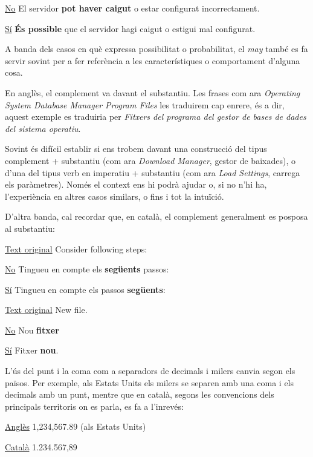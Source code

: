 \documentclass[9pt]{cheatsheet}
\begin{document}
\begin{multicols*}{3}
\underline {No} El servidor \textbf{pot haver caigut} o estar configurat incorrectament.

\underline {Sí} \textbf{És possible} que el servidor hagi caigut o estigui mal configurat.

A banda dels casos en què expressa possibilitat o probabilitat, el \emph{may} també es fa servir sovint per a fer referència a les característiques o comportament d’alguna cosa.


En anglès, el complement va davant el substantiu. Les frases com ara \emph{Operating System Database Manager Program Files} les traduirem cap enrere, és a dir, aquest exemple es traduiria per \emph{Fitxers del programa del gestor de bases de dades del sistema operatiu}.

Sovint és difícil establir si ens trobem davant una construcció del tipus complement + substantiu (com ara \emph{Download Manager}, gestor de baixades), o d’una del tipus verb en imperatiu + substantiu (com ara \emph{Load Settings}, carrega els paràmetres). Només el context ens hi podrà ajudar o, si no n’hi ha, l’experiència en altres casos similars, o fins i tot la intuïció.

D’altra banda, cal recordar que, en català, el complement generalment es posposa al substantiu:

\underline {Text original} Consider following steps:

\underline {No} Tingueu en compte els \textbf{següents} passos:

\underline {Sí} Tingueu en compte els passos \textbf{següents}:


\underline {Text original} New file.

\underline {No} Nou \textbf{fitxer}

\underline {Sí} Fitxer \textbf{nou}.




L’ús del punt i la coma com a separadors de decimals i milers canvia segon els països. Per exemple, als Estats Units els milers se separen amb una coma i els decimals amb un punt, mentre que en català, segons les convencions dels principals territoris on es parla, es fa a l’inrevés:

\underline {Anglès} 1,234,567.89 (als Estats Units)

\underline {Català} 1.234.567,89



\end{multicols*}
\end{document}
